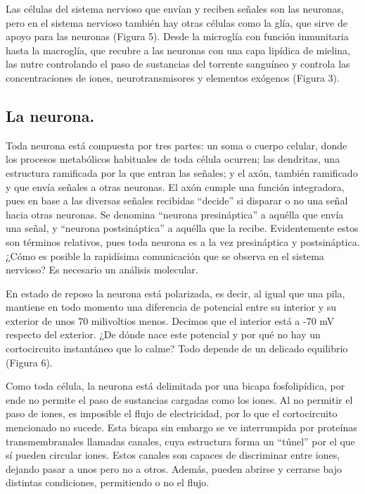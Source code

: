 Las células del sistema nervioso que envían y reciben señales son las neuronas, pero en el sistema nervioso también hay otras células como la glía, que sirve de apoyo para las neuronas (Figura 5). Desde la microglía con función inmunitaria hasta la macroglía, que recubre a las neuronas con una capa lipídica de mielina, las nutre controlando el paso de sustancias del torrente sanguíneo y controla las concentraciones de iones, neurotransmisores y elementos exógenos (Figura 3).


\subsection{La neurona.}

Toda neurona está compuesta por tres partes: un soma o cuerpo celular, donde los procesos metabólicos habituales de toda célula ocurren; las dendritas, una estructura ramificada por la que entran las señales; y el axón, también ramificado y que envía señales a otras neuronas. El axón cumple una función integradora, pues en base a las diversas señales recibidas \enquote{decide} si disparar o no una señal hacia otras neuronas. Se denomina \enquote{neurona presináptica} a aquélla que envía una señal, y \enquote{neurona postsináptica} a aquélla que la recibe. Evidentemente estos son términos relativos, pues toda neurona es a la vez presináptica y postsináptica. ¿Cómo es posible la rapidísima comunicación que se observa en el sistema nervioso? Es necesario un análisis molecular.

En estado de reposo la neurona está polarizada, es decir, al igual que una pila, mantiene en todo momento una diferencia de potencial entre su interior y su exterior de unos 70 milivoltios menos. Decimos que el interior está a -70 mV respecto del exterior. ¿De dónde nace este potencial y por qué no hay un cortocircuito instantáneo que lo calme? Todo depende de un delicado equilibrio (Figura 6).

Como toda célula, la neurona está delimitada por una bicapa fosfolipídica, por ende no permite el paso de sustancias cargadas como los iones. Al no permitir el paso de iones, es imposible el flujo de electricidad, por lo que el cortocircuito mencionado no sucede. Esta bicapa sin embargo se ve interrumpida por proteínas transmembranales llamadas canales, cuya estructura forma un \enquote{túnel} por el que sí pueden circular iones. Estos canales son capaces de discriminar entre iones, dejando pasar a unos pero no a otros. Además, pueden abrirse y cerrarse bajo distintas condiciones, permitiendo o no el flujo.

